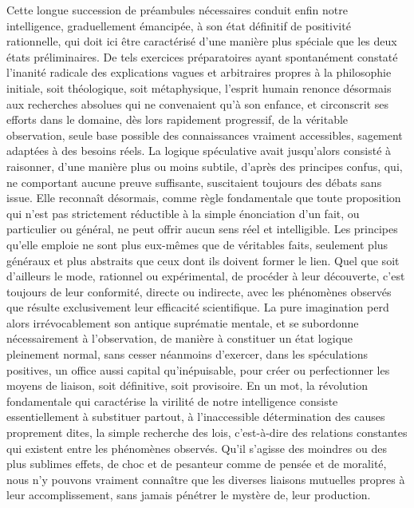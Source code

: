 \documentclass[french,twoside]{book} %
\begin{document}
Cette longue succession de préambules nécessaires conduit enfin notre intelligence, graduellement émancipée, à son état définitif de positivité rationnelle, qui doit ici être caractérisé d’une manière plus spéciale que les deux états préliminaires. De tels exercices préparatoires ayant spontanément constaté l’inanité radicale des explications vagues et arbitraires propres à la philosophie initiale, soit théologique, soit métaphysique, l’esprit humain renonce désormais aux recherches absolues qui ne convenaient qu’à son enfance, et circonscrit ses efforts dans le domaine, dès lors rapidement progressif, de la véritable observation, seule base possible des connaissances vraiment accessibles, sagement adaptées à des besoins réels. La logique spéculative avait jusqu’alors consisté à raisonner, d’une manière plus ou moins subtile, d’après des principes confus, qui, ne comportant aucune preuve suffisante, suscitaient toujours des débats sans issue. Elle reconnaît désormais, comme règle fondamentale que toute proposition qui n’est pas strictement réductible à la simple énonciation d’un fait, ou particulier ou général, ne peut offrir aucun sens réel et intelligible. Les principes qu’elle emploie ne sont plus eux-mêmes que de véritables faits, seulement plus généraux et plus abstraits que ceux dont ils doivent former le lien. Quel que soit d’ailleurs le mode, rationnel ou expérimental, de procéder à leur découverte, c’est toujours de leur conformité, directe ou indirecte, avec les phénomènes observés que résulte exclusivement leur efficacité scientifique. La pure imagination perd alors irrévocablement son antique suprématie mentale, et se subordonne nécessairement à l’observation, de manière à constituer un état logique pleinement normal, sans cesser néanmoins d’exercer, dans les spéculations positives, un office aussi capital qu’inépuisable, pour créer ou perfectionner les moyens de liaison, soit définitive, soit provisoire. En un mot, la révolution fondamentale qui caractérise la virilité de notre intelligence consiste essentiellement à substituer partout, à l’inaccessible détermination des causes proprement dites, la simple recherche des lois, c’est-à-dire des relations constantes qui existent entre les phénomènes observés. Qu’il s’agisse des moindres ou des plus sublimes effets, de choc et de pesanteur comme de pensée et de moralité, nous n’y pouvons vraiment connaître que les diverses liaisons mutuelles propres à leur accomplissement, sans jamais pénétrer le mystère de, leur production.\par
\end{document}
